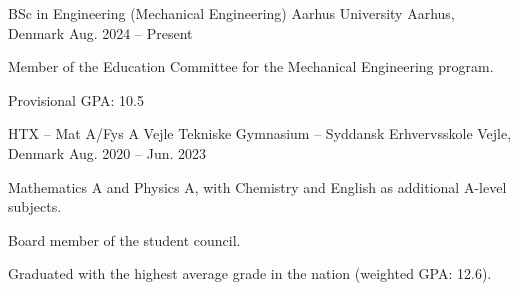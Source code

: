 
\begin{cventries}
  \cventry
    {BSc in Engineering (Mechanical Engineering)} %
    {Aarhus University}   %
    {Aarhus, Denmark}     %
    {Aug. 2024 -- Present} %
    {
      \begin{cvitems} %
        \item Member of the Education Committee for the Mechanical Engineering program.
        \item Provisional GPA: 10.5
      \end{cvitems}
    }
  
  \cventry
    {HTX -- Mat A/Fys A} %
    {Vejle Tekniske Gymnasium -- Syddansk Erhvervsskole} %
    {Vejle, Denmark} %
    {Aug. 2020 -- Jun. 2023} %
    {
      \begin{cvitems} %
        \item Mathematics A and Physics A, with Chemistry and English as additional A-level subjects.
        \item Board member of the student council.
        \item Graduated with the highest average grade in the nation (weighted GPA: 12.6).
      \end{cvitems}
    }
\end{cventries}
